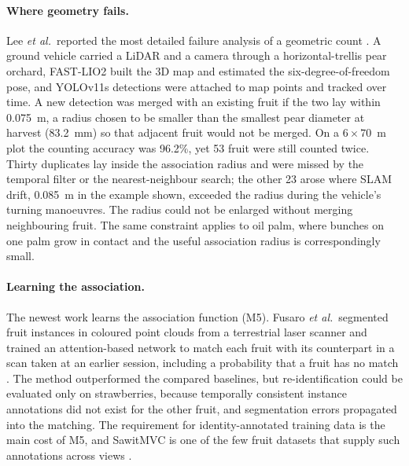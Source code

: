 \paragraph{Where geometry fails.} Lee \textit{et al.}\ reported the most detailed failure analysis of a geometric count \cite{ledger_r_d4270ea8ab11f268}. A ground vehicle carried a LiDAR and a camera through a horizontal-trellis pear orchard, FAST-LIO2 built the 3D map and estimated the six-degree-of-freedom pose, and YOLOv11s detections were attached to map points and tracked over time. A new detection was merged with an existing fruit if the two lay within 0.075~m, a radius chosen to be smaller than the smallest pear diameter at harvest (83.2~mm) so that adjacent fruit would not be merged. On a $6\times70$~m plot the counting accuracy was 96.2\%, yet 53 fruit were still counted twice. Thirty duplicates lay inside the association radius and were missed by the temporal filter or the nearest-neighbour search; the other 23 arose where SLAM drift, 0.085~m in the example shown, exceeded the radius during the vehicle's turning manoeuvres. The radius could not be enlarged without merging neighbouring fruit. The same constraint applies to oil palm, where bunches on one palm grow in contact and the useful association radius is correspondingly small.

\paragraph{Learning the association.} The newest work learns the association function (M5). Fusaro \textit{et al.}\ segmented fruit instances in coloured point clouds from a terrestrial laser scanner and trained an attention-based network to match each fruit with its counterpart in a scan taken at an earlier session, including a probability that a fruit has no match \cite{ledger_r_0eda6374aaf85fae}. The method outperformed the compared baselines, but re-identification could be evaluated only on strawberries, because temporally consistent instance annotations did not exist for the other fruit, and segmentation errors propagated into the matching. The requirement for identity-annotated training data is the main cost of M5, and SawitMVC is one of the few fruit datasets that supply such annotations across views \cite{indriani2026sawitmvc}.

